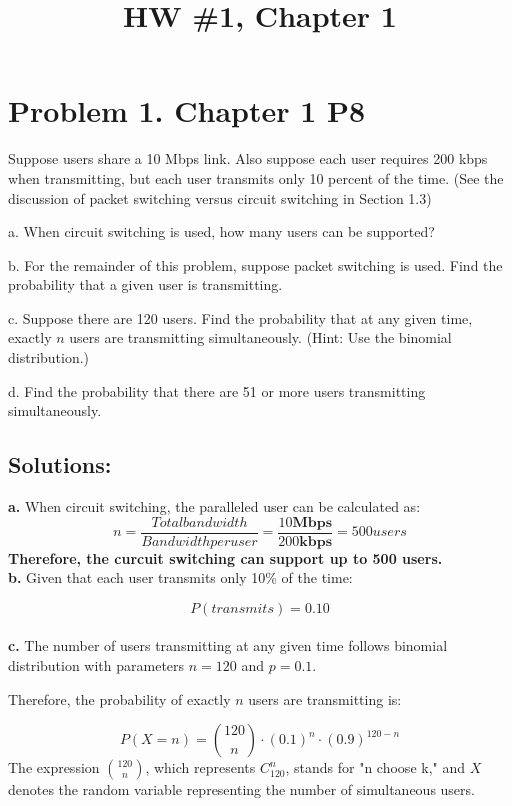 \documentclass{cshwk}
\begin{document}
\title{HW \#1, Chapter 1}
\maketitle

\section*{Problem 1. Chapter 1 P8}

    Suppose users share a 10 Mbps link. Also suppose each user requires 200 kbps when transmitting, but each user transmits only 10 percent of the time. (See the discussion of packet switching versus circuit switching in Section 1.3)

    a. When circuit switching is used, how many users can be supported?

    b. For the remainder of this problem, suppose packet switching is used. Find the probability that a given user is transmitting.

    c. Suppose there are 120 users. Find the probability that at any given time, exactly \(n\) users are transmitting simultaneously. (Hint: Use the binomial distribution.)

    d. Find the probability that there are 51 or more users transmitting simultaneously.

\subsection*{Solutions:}

\textbf{a.} When circuit switching, the paralleled user can be calculated as:
$$
n = \frac{Total bandwidth}{Bandwidth per user} = \frac{10 \mathbf{Mbps}}{ 200 \mathbf{kbps}} = 500 users
$$
\textbf{Therefore, the curcuit switching can support up to 500 users.}
\\

\noindent\textbf{b.} Given that each user transmits only 10\% of the time:

$$
\boxed{P(transmits) = 0.10}
$$
\\
\noindent\textbf{c.} The number of users transmitting at any given time follows binomial distribution with parameters $n=120$ and $p=0.1$.

Therefore, the probability of exactly $n$ users are transmitting is:

$$
\boxed{P(X = n) = \binom{120}{n}\cdot (0.1)^n \cdot (0.9)^{120-n}}
$$
The expression $\binom{120}{n}$, which represents $C_{120}^n$, stands for "n choose k," and $X$ denotes the random variable representing the number of simultaneous users.
\\
\end{document}
